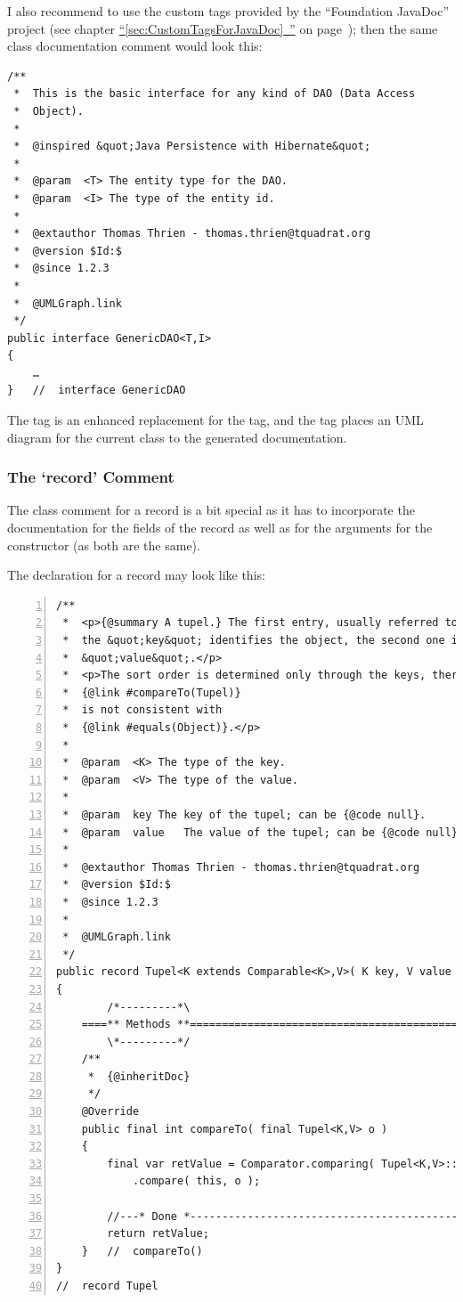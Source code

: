 \documentclass[11pt,a4paper, titlepage, parskip=half, headsepline, footsepline, cleardoublepage=current, headheight=1cm]{scrbook}
\newcommand*{\tqfullvref}[1]{\hyperref[{#1}]{“\ref*{#1}~\nameref*{#1}”} on page~\pageref{#1}}
\begin{document}
I also recommend to use the custom tags provided by the “Foundation JavaDoc” project\autocite{TQUADRAT_ORG_FOUNDATION_JAVADOC} (see chapter \tqfullvref{sec:CustomTagsForJavaDoc}); then the same class documentation comment would look this:
\begin{lstlisting}
/**
 *  This is the basic interface for any kind of DAO (Data Access
 *  Object).
 * 
 *  @inspired &quot;Java Persistence with Hibernate&quot;
 *
 *  @param  <T> The entity type for the DAO.
 *  @param  <I> The type of the entity id.
 *
 *  @extauthor Thomas Thrien - thomas.thrien@tquadrat.org
 *  @version $Id:$
 *  @since 1.2.3
 *
 *  @UMLGraph.link
 */
public interface GenericDAO<T,I>
{
    …
}   //  interface GenericDAO
\end{lstlisting}
The tag  is an enhanced replacement for the  tag, and the tag  places an UML diagram for the current class to the generated documentation.


\subsubsection{The ‘record’ Comment}\label{sec:RecordComment}
The class comment for a record is a bit special as it has to incorporate the documentation for the fields of the record as well as for the arguments for the constructor (as both are the same).

The declaration for a record may look like this:
\begin{lstlisting}[numbers=left,caption={A tupel class}]
/**
 *  <p>{@summary A tupel.} The first entry, usually referred to as 
 *  the &quot;key&quot; identifies the object, the second one is the
 *  &quot;value&quot;.</p>
 *  <p>The sort order is determined only through the keys, therefore
 *  {@link #compareTo(Tupel)}
 *  is not consistent with
 *  {@link #equals(Object)}.</p>
 *
 *  @param  <K> The type of the key.
 *  @param  <V> The type of the value.
 *
 *  @param  key The key of the tupel; can be {@code null}.
 *  @param  value   The value of the tupel; can be {@code null}.
 *
 *  @extauthor Thomas Thrien - thomas.thrien@tquadrat.org
 *  @version $Id:$
 *  @since 1.2.3
 *
 *  @UMLGraph.link
 */
public record Tupel<K extends Comparable<K>,V>( K key, V value ) implements Comparable<Tupel<K,V>
{
        /*---------*\
    ====** Methods **================================================
        \*---------*/
    /**
     *  {@inheritDoc} 
     */
    @Override
    public final int compareTo( final Tupel<K,V> o )
    {
        final var retValue = Comparator.comparing( Tupel<K,V>::key )
            .compare( this, o ); 

        //---* Done *------------------------------------------------
        return retValue;
    }   //  compareTo()
}
//  record Tupel
\end{lstlisting}
\end{document}
